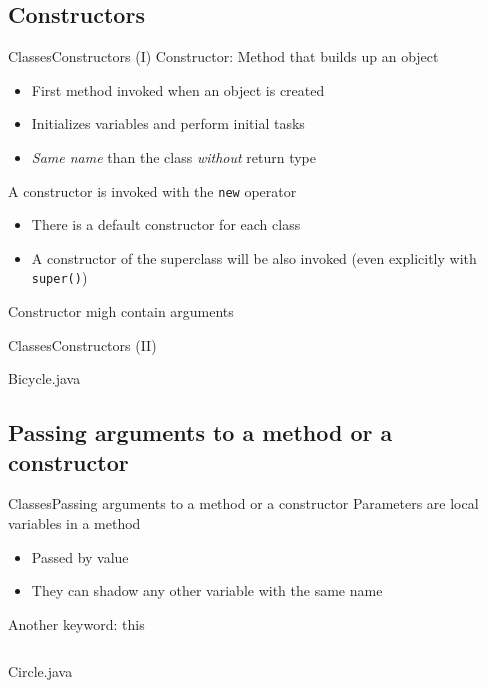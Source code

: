 \documentclass[10pt,compress]{beamer} %
\begin{document}
\subsection{Constructors}
\begin{frame}{Classes}{Constructors (I)}
	\alert{Constructor}: Method that builds up an object
	\begin{itemize}
	\item First method invoked when an object is created
	\item Initializes variables and perform initial tasks
	\item \textit{Same name} than the class \textit{without} return type
	\end{itemize}
	A constructor is invoked with the \texttt{new} operator
	\begin{itemize}
		\item There is a default constructor for each class
		\item A constructor of the superclass will be also invoked (even explicitly with \texttt{super()})
	\end{itemize}
	Constructor migh contain arguments
\end{frame}

\begin{frame}[shrink]{Classes}{Constructors (II)}
	\vspace{-0.2cm}
	\begin{block}{Bicycle.java}
	\vspace{-0.2cm}
		
	\end{block}
\end{frame}

\subsection{Passing arguments to a method or a constructor}
\begin{frame}{Classes}{Passing arguments to a method or a constructor}
	Parameters are local variables in a method
	\begin{itemize}
		\item Passed by value
		\item They can shadow any other variable with the same name
	\end{itemize}
	Another keyword: \alert{this}

    \begin{columns}
	\vspace{-0.2cm}
	\begin{block}{Circle.java}
	\vspace{-0.2cm}
		
	\vspace{-0.2cm}
	\end{block}
	\end{columns}
\end{frame}
\end{document}
